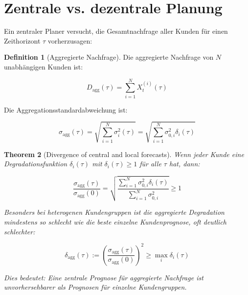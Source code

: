 \documentclass[12pt, a4paper, titlepage]{report}
\newtheorem{theorem}{Theorem}[section]
\theoremstyle{definition}
\newtheorem{definition}[theorem]{Definition}
\theoremstyle{remark}
\begin{document}
\section{Zentrale vs. dezentrale Planung}

Ein zentraler Planer versucht, die Gesamtnachfrage aller Kunden für einen Zeithorizont $\tau$ vorherzusagen:

\begin{definition}[Aggregierte Nachfrage]
Die aggregierte Nachfrage von $N$ unabhängigen Kunden ist:

\begin{equation}
D_{\text{agg}}(\tau) = \sum_{i=1}^N X_t^{(i)}(\tau)
\label{eq:aggregate_demand}
\end{equation}

Die Aggregationsstandardabweichung ist:

\begin{equation}
\sigma_{\text{agg}}(\tau) = \sqrt{\sum_{i=1}^N \sigma_i^2(\tau)} = \sqrt{\sum_{i=1}^N \sigma_{0,i}^2 \delta_i(\tau)}
\end{equation}
\end{definition}

\begin{theorem}[Divergence of central and local forecasts]
\label{thm:forecast_divergence}
Wenn jeder Kunde eine Degradationsfunktion $\delta_i(\tau)$ mit $\delta_i(\tau) \geq 1$ für alle $\tau$ hat, dann:

\begin{equation}
\frac{\sigma_{\text{agg}}(\tau)}{\sigma_{\text{agg}}(0)} = \sqrt{\frac{\sum_{i=1}^N \sigma_{0,i}^2 \delta_i(\tau)}{\sum_{i=1}^N \sigma_{0,i}^2}} \geq 1
\end{equation}

Besonders bei heterogenen Kundengruppen ist die aggregierte Degradation \emph{mindestens} so schlecht wie die beste einzelne Kundenprognose, oft deutlich schlechter:

\begin{equation}
\delta_{\text{agg}}(\tau) := \left(\frac{\sigma_{\text{agg}}(\tau)}{\sigma_{\text{agg}}(0)}\right)^2 \geq \max_i \delta_i(\tau)
\end{equation}

Dies bedeutet: Eine zentrale Prognose für aggregierte Nachfrage ist \emph{unvorhersehbarer} als Prognosen für einzelne Kundengruppen.
\end{theorem}
\end{document}
